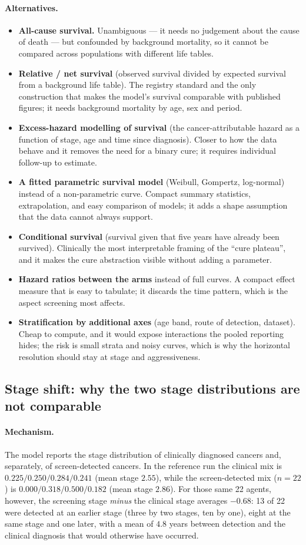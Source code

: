 \documentclass[12pt,a4paper]{article}
\newcommand{\mech}[1]{\paragraph{Mechanism.} #1}
\newcommand{\alt}[1]{\paragraph{Alternatives.} #1}
\begin{document}
\alt{\begin{itemize}[nosep]
  \item \textbf{All-cause survival.} Unambiguous --- it needs no judgement about the cause of death --- but
        confounded by background mortality, so it cannot be compared across populations with different life
        tables.
  \item \textbf{Relative / net survival} (observed survival divided by expected survival from a background
        life table). The registry standard and the only construction that makes the model's survival
        comparable with published figures; it needs background mortality by age, sex and period.
  \item \textbf{Excess-hazard modelling of survival} (the cancer-attributable hazard as a function of stage,
        age and time since diagnosis). Closer to how the data behave and it removes the need for a binary
        cure; it requires individual follow-up to estimate.
  \item \textbf{A fitted parametric survival model} (Weibull, Gompertz, log-normal) instead of a
        non-parametric curve. Compact summary statistics, extrapolation, and easy comparison of models; it
        adds a shape assumption that the data cannot always support.
  \item \textbf{Conditional survival} (survival given that five years have already been survived). Clinically
        the most interpretable framing of the ``cure plateau'', and it makes the cure abstraction visible
        without adding a parameter.
  \item \textbf{Hazard ratios between the arms} instead of full curves. A compact effect measure that is easy
        to tabulate; it discards the time pattern, which is the aspect screening most affects.
  \item \textbf{Stratification by additional axes} (age band, route of detection, dataset). Cheap to
        compute, and it would expose interactions the pooled reporting hides; the risk is small strata and
        noisy curves, which is why the horizontal resolution should stay at stage and aggressiveness.
\end{itemize}}

\subsection{Stage shift: why the two stage distributions are not comparable}
\label{sec:stageshift}

\mech{The model reports the stage distribution of clinically diagnosed cancers and, separately, of
screen-detected cancers. In the reference run the clinical mix is $0.225/0.250/0.284/0.241$ (mean stage
$2.55$), while the screen-detected mix ($n = 22$) is $0.000/0.318/0.500/0.182$ (mean stage $2.86$). For
those same 22 agents, however, the screening stage \emph{minus} the clinical stage averages $-0.68$: 13 of
22 were detected at an earlier stage (three by two stages, ten by one), eight at the same stage and one
later, with a mean of $4.8$ years between detection and the clinical diagnosis that would otherwise have
occurred.}
\end{document}
